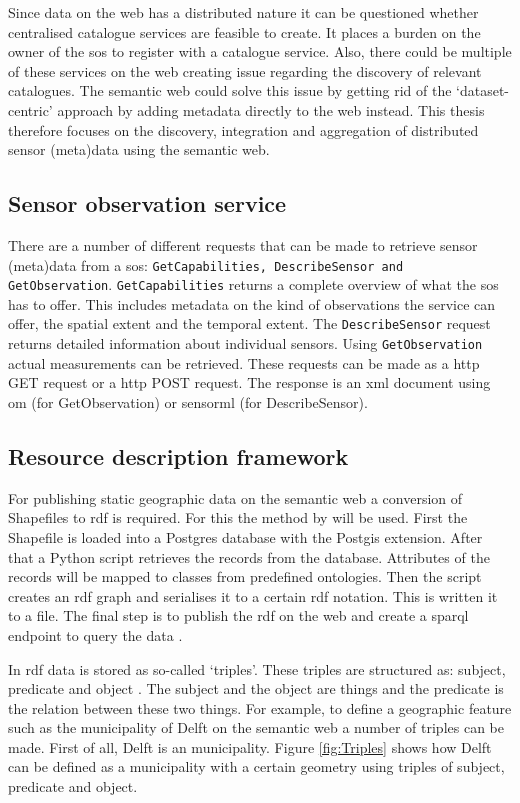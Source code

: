 Since data on the web has a distributed nature it can be questioned whether centralised catalogue services are feasible to create. It places a burden on the owner of the \ac{sos} to register with a catalogue service. Also, there could be multiple of these services on the web creating issue regarding the discovery of relevant catalogues. The semantic web could solve this issue by getting rid of the `dataset-centric' approach by adding metadata directly to the web instead. This thesis therefore focuses on the discovery, integration and aggregation of distributed sensor (meta)data using the semantic web.

\subsection{Sensor observation service}
There are a number of different requests that can be made to retrieve sensor (meta)data from a \ac{sos}: \texttt{GetCapabilities, DescribeSensor and GetObservation}. \texttt{GetCapabilities} returns a complete overview of what the \ac{sos} has to offer. This includes metadata on the kind of observations the service can offer, the spatial extent and the temporal extent. The  \texttt{DescribeSensor} request returns detailed information about individual sensors. Using \texttt{GetObservation} actual measurements can be retrieved. These requests can be made as a \ac{http} GET request or a \ac{http} POST request. The response is an \ac{xml} document using \ac{om} (for GetObservation) or \ac{sensorml} (for DescribeSensor).

\subsection{Resource description framework}
For publishing static geographic data on the semantic web a conversion of Shapefiles to \ac{rdf} is required. For this the method by \cite{LD:Missier} will be used. First the Shapefile is loaded into a Postgres database with the Postgis extension. After that a Python script retrieves the records from the database. Attributes of the records will be mapped to classes from predefined ontologies. Then the script creates an \ac{rdf} graph and serialises it to a certain \ac{rdf} notation. This is written it to a file. The final step is to publish the \ac{rdf} on the web and create a \ac{sparql} endpoint to query the data \citep{LD:Missier}. 

In \ac{rdf} data is stored as so-called `triples'. These triples are structured as: subject, predicate and object \citep{LD:Berners-lee}. The subject and the object are things and the predicate is the relation between these two things. For example, to define a geographic feature such as the municipality of Delft on the semantic web a number of triples can be made. First of all, Delft is an municipality. Figure \ref{fig:Triples} shows how Delft can be defined as a municipality with a certain geometry using triples of subject, predicate and object.

